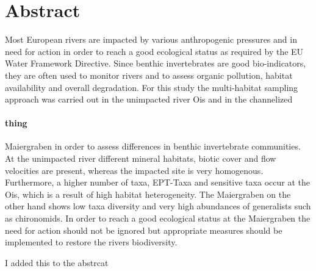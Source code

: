 
\setcounter{secnumdepth}{0}                    %

\section{Abstract}
Most European rivers are impacted by various anthropogenic pressures and in need for action in order to reach a good ecological status as required by the EU Water Framework Directive. Since benthic invertebrates are good bio-indicators, they are often used to monitor rivers and to assess organic pollution, habitat availability and overall degradation. For this study the multi-habitat sampling approach was carried out in the unimpacted river Ois and in the channelized

\paragraph{thing}
 Maiergraben in order to assess differences in benthic invertebrate communities. At the unimpacted river different mineral habitats, biotic cover and flow velocities are present, whereas the impacted site is very homogenous. Furthermore, a higher number of taxa, EPT-Taxa and sensitive taxa occur at the Ois, which is a result of high habitat heterogeneity. The Maiergraben on the other hand shows low taxa diversity and very high abundances of generalists such as chironomids. In order to reach a good ecological status at the Maiergraben the need for action should not be ignored but appropriate measures should be implemented to restore the rivers biodiversity.




I added this to the abstrcat
 